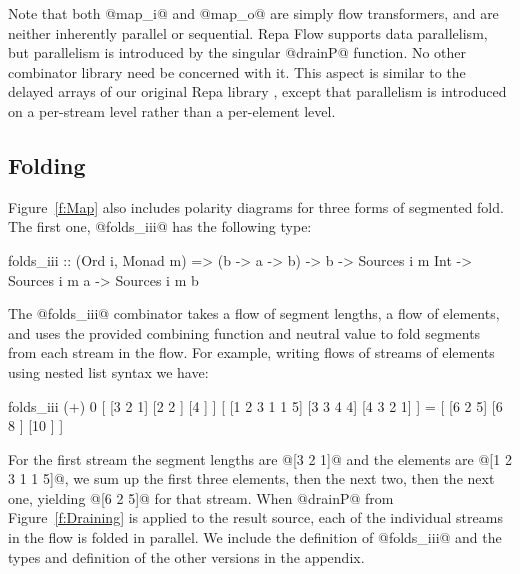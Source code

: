 
Note that both @map_i@ and @map_o@ are simply flow transformers, and are neither inherently parallel or sequential. Repa Flow supports data parallelism, but parallelism is introduced by the singular @drainP@ function. No other combinator library need be concerned with it. This aspect is similar to the delayed arrays of our original Repa library \cite{Lippmeier:Guiding}, except that parallelism is introduced on a per-stream level rather than a per-element level.


\subsection{Folding}
Figure~\ref{f:Map} also includes polarity diagrams for three forms of segmented fold. The first one, @folds_iii@ has the following type:
\begin{code}
folds_iii :: (Ord i, Monad m) => (b -> a -> b) -> b
          -> Sources i m Int  -> Sources i m a 
          -> Sources i m b
\end{code}

The @folds_iii@ combinator takes a flow of segment lengths, a flow of elements, and uses the provided combining function and neutral value to fold segments from each stream in the flow. For example, writing flows of streams of elements using nested list syntax we have:
\begin{code}
folds_iii (+) 0 
   [ [3     2   1] [2   2  ] [4      ] ] 
   [ [1 2 3 1 1 5] [3 3 4 4] [4 3 2 1] ]
 = [ [6     2   5] [6   8  ] [10     ] ]
\end{code}

For the first stream the segment lengths are @[3 2 1]@ and the elements are @[1 2 3 1 1 5]@, we sum up the first three elements, then the next two, then the next one, yielding @[6 2 5]@ for that stream. When @drainP@ from Figure~\ref{f:Draining} is applied to the result source, each of the individual streams in the flow is folded in parallel. We include the definition of @folds_iii@ and the types and definition of the other versions in the appendix.

